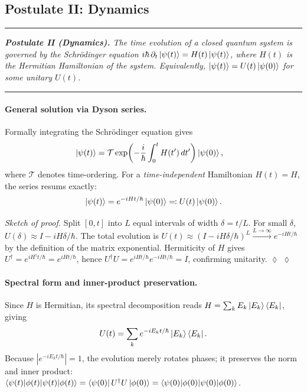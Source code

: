 \documentclass[aps, reprint, twocolumn, superscriptaddress, floatfix]{revtex4-2}
\newenvironment{statement}{%
  \par\addvspace{5pt}%
  \noindent\rule{\linewidth}{0.4pt}\nopagebreak\par\vspace{2pt}%
  \noindent\begingroup\small\itshape}{%
  \endgroup\par\vspace{2pt}\nopagebreak%
  \noindent\rule{\linewidth}{0.4pt}\par\addvspace{5pt}}
\newenvironment{proofsketch}[1][Sketch of proof]{%
  \par\smallskip\noindent\textit{#1.}\enspace}{%
  \hspace*{\fill}$\lozenge$\par\smallskip}
\begin{document}
\subsection{Postulate II: Dynamics}
\label{ssec:dynamics}

\begin{statement}
\textbf{Postulate II (Dynamics).}
The time evolution of a closed quantum system is governed by the
Schr\"{o}dinger equation
$i\hbar\,\partial_t\ket{\psi(t)} = H(t)\ket{\psi(t)}$,
where $H(t)$ is the Hermitian Hamiltonian of the system.
Equivalently, $\ket{\psi(t)} = U(t)\ket{\psi(0)}$ for some unitary $U(t)$.
\end{statement}

\paragraph{General solution via Dyson series.}
Formally integrating the Schr\"{o}dinger equation gives
\begin{align}
  \ket{\psi(t)} &= \mathcal{T}\exp\!\left(-\frac{i}{\hbar}\int_0^t H(t')\,dt'\right)\ket{\psi(0)},
  \label{eq:dyson}
\end{align}
where $\mathcal{T}$ denotes time-ordering.  For a \emph{time-independent}
Hamiltonian $H(t) = H$, the series resums exactly:
\begin{equation}
  \ket{\psi(t)} = e^{-iHt/\hbar}\ket{\psi(0)} \eqqcolon U(t)\ket{\psi(0)}.
  \label{eq:time-indep}
\end{equation}

\begin{proofsketch}
Split $[0,t]$ into $L$ equal intervals of width $\delta=t/L$.  For small $\delta$,
$U(\delta)\approx I - i H\delta/\hbar$.  The total evolution is
$U(t)\approx (I-iH\delta/\hbar)^L \xrightarrow{L\to\infty} e^{-iHt/\hbar}$
by the definition of the matrix exponential.  Hermiticity of $H$ gives
$U^\dagger = e^{iH^\dagger t/\hbar} = e^{iHt/\hbar}$, hence
$U^\dagger U = e^{iHt/\hbar}e^{-iHt/\hbar} = I$, confirming unitarity. $\lozenge$
\end{proofsketch}

\paragraph{Spectral form and inner-product preservation.}
Since $H$ is Hermitian, its spectral decomposition reads
$H = \sum_k E_k \ket{E_k}\bra{E_k}$, giving
\begin{equation}
  U(t) = \sum_k e^{-iE_k t/\hbar} \ket{E_k}\bra{E_k}.
\end{equation}
Because $|e^{-iE_k t/\hbar}|=1$, the evolution merely rotates phases; it preserves
the norm and inner product:
$\braket{\psi(t)|\phi(t)} = \bra{\psi(0)}U^\dagger U\ket{\phi(0)} = \braket{\psi(0)|\phi(0)}$.
\end{document}
